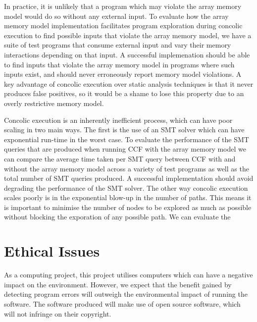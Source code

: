 \documentclass[12pt,twoside]{report}
\begin{document}
In practice, it is unlikely that a program which may violate the array memory model would do so without any external input. To evaluate how the array memory model implementation facilitates program exploration during concolic execution to find possible inputs that violate the array memory model, we have a suite of test programs that consume external input and vary their memory interactions depending on that input. A successful implemenation should be able to find inputs that violate the array memory model in programs where such inputs exist, and should never erroneously report memory model violations. A key advantage of concolic execution over static analysis techniques is that it never produces false positives, so it would be a shame to lose this property due to an overly restrictive memory model.

Concolic execution is an inherently inefficient process, which can have poor scaling in two main ways. The first is the use of an SMT solver which can have exponential run-time in the worst case. To evaluate the performance of the SMT queries that are produced when running CCF with the array memory model we can compare the average time taken per SMT query between CCF with and without the array memory model across a variety of test programs as well as the total number of SMT queries produced. A successful implementation should avoid degrading the performance of the SMT solver. The other way concolic execution scales poorly is in the exponential blow-up in the number of paths. This means it is important to minimise the number of nodes to be explored as much as possible without blocking the exporation of any possible path. We can evaluate the 

\chapter{Ethical Issues}

 As a computing project, this project utilises computers which can have a negative impact on the environment. However, we expect that the benefit gained by detecting program errors will outweigh the environmental impact of running the software. The software produced will make use of open source software, which will not infringe on their copyright.
\end{document}
